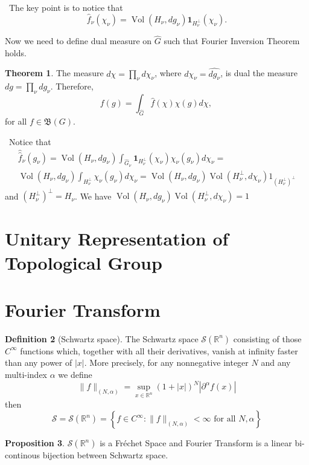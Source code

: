\documentclass[12pt,a4paper]{book}
\newenvironment{prooff}{{\noindent\it\textcolor{cyan!40!black}{Proof}:}\,}{\par}
\newcommand{\bb}[1]{\mathbb{#1}}
\theoremstyle{definition}
\newtheorem{defn}{Definition}[section]
\newtheorem{theo}[defn]{Theorem}
\newtheorem{prop}[defn]{Proposition}
\begin{document}
\begin{prooff}
    The key point is to notice that 
    $$
    \hat{f}_\nu\left(\chi_\nu\right)=\operatorname{Vol}\left(H_\nu, d g_\nu\right) \mathbf{1}_{H_\nu^{\perp}}\left(\chi_\nu\right).
    $$
\end{prooff}
Now we need to define dual measure on $\hat{G}$ such that Fourier Inversion Theorem holds. 
\begin{theo}
    The measure $d \chi=\prod_\nu d \chi_\nu$, where $d \chi_\nu=\widehat{d g_\nu}$, is dual the measure $d g=\prod_\nu d g_\nu$. Therefore,
    $$
    f(g)=\int_{\hat{G}} \hat{f}(\chi) \chi(g) d \chi \text {, }
    $$
    for all $f \in \mathfrak{B}(G)$.
\end{theo}
\begin{prooff}
Notice that 
    \begin{align*} 
    \hat{\hat{f}}_\nu\left(g_\nu\right)=\operatorname{Vol}\left(H_\nu, d g_\nu\right) \int_{\hat{G}_\nu} \mathbf{1}_{H_\nu^{\perp}}\left(\chi_\nu\right) \chi_\nu\left(g_\nu\right) d \chi_\nu= \\ 
    \operatorname{Vol}\left(H_\nu, d g_\nu\right) 
    \int_{H_\nu^{\perp}} \chi_\nu\left(g_\nu\right) d \chi_\nu=\operatorname{Vol}\left(H_\nu, d g_\nu\right) \operatorname{Vol}\left(H_\nu^{\perp}, d \chi_\nu\right) 1_{\left(H_\nu^{\perp}\right)^{\perp}}
    \end{align*}
    and $(H_\nu^\perp)^\perp=H_{\nu}$.
    We have $\operatorname{Vol}\left(H_\nu, d g_\nu\right) \operatorname{Vol}\left(H_\nu^{\perp}, d \chi_\nu\right)=1$
\end{prooff}

\section{Unitary Representation of Topological Group}

\section{Fourier Transform}
\begin{defn}[Schwartz space]
    The Schwartz space $\mathcal{S}(\mathbb{R}^n)$ consisting of those $C^{\infty}$ functions which, together with all their derivatives, vanish at infinity
    faster than any power of $|x|$. More precisely, for any nonnegative integer $N$ and any multi-index $\alpha$ we define   
    $$
    \|f\|_{(N, \alpha)}=\sup _{x \in \mathbb{R}^n}(1+|x|)^N\left|\partial^\alpha f(x)\right|
    $$
    then
    $$
    \mathcal{S}=\mathcal{S}(\bb{R}^n)=\left\{f \in C^{\infty}:\|f\|_{(N, \alpha)}<\infty \text { for all } N, \alpha\right\}
    $$
\end{defn}
\begin{prop}
    $\mathcal{S}(\bb{R}^n)$ is a Fréchet Space and Fourier Transform is a linear bi-continous bijection 
    between Schwartz space.
\end{prop}
\end{document}
